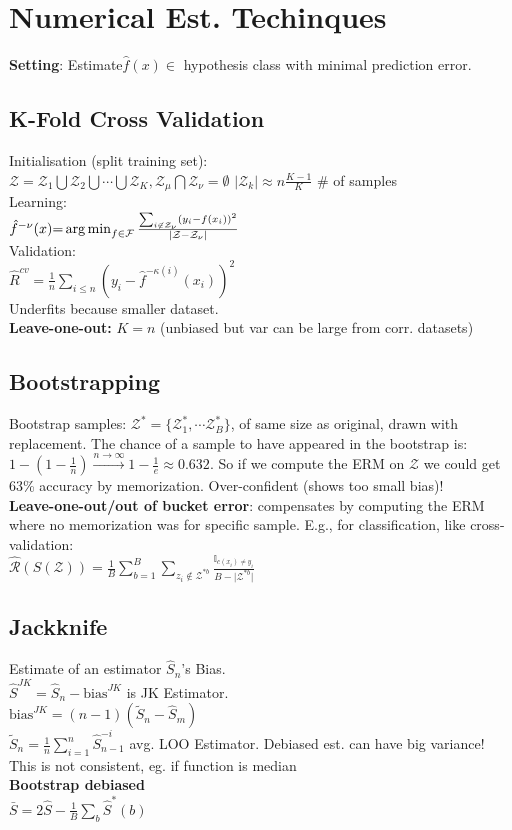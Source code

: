 \section*{Numerical Est. Techinques}
\textbf{Setting}: Estimate$\hat{f}(x) \in $ hypothesis class with minimal prediction error.

\subsection*{K-Fold Cross Validation}
Initialisation (split training set):\\
$\mathcal{Z}=\mathcal{Z}_1\bigcup\mathcal{Z}_2\bigcup\cdots\bigcup\mathcal{Z}_K, \mathcal{Z}_\mu \bigcap\mathcal{Z}_\nu = \emptyset $
$|\mathcal{Z}_k|\approx n\frac{K-1}{K}$ \# of samples\\
Learning:\\
$\hat{f}^{-\nu}(x){=}
\operatorname*{arg\,min}_{f\in\mathcal{F}}\frac{\sum_{i\not\in\mathcal{Z}_\nu}(y_i-f(x_i))^2}{|\mathcal{Z}-\mathcal{Z}_{\nu}|}$\\
Validation:\\
$\hat{R}^{cv} = \frac{1}{n}\sum_{i\leq n}(y_i-\hat{f}^{-\kappa(i)}(x_i))^2$\\
Underfits because smaller dataset.\\
\textbf{Leave-one-out:} $K=n$ (unbiased but var can be large from corr. datasets)
\subsection*{Bootstrapping}
Bootstrap samples: $\mathcal{Z}^*=\{\mathcal{Z}_1^*, \cdots\mathcal{Z}_B^*\}$, of same size as original, drawn with replacement.
The chance of a sample to have appeared in the bootstrap is:\\
$1-(1-\frac{1}{n})\stackrel{n\to\infty}{\to} 1-\frac{1}{e}\approx 0.632$. So if we compute the ERM on $\mathcal{Z}$ we could get 63\% accuracy by memorization. Over-confident (shows too small bias)!\\
\textbf{Leave-one-out/out of bucket error}: compensates by computing the ERM where no memorization was for specific sample. E.g., for classification, like cross-validation:\\
$\hat{\mathcal{R}}(S(\mathcal{Z}))=\frac{1}{B}\sum_{b=1}^B\sum_{z_i\not\in\mathcal{Z}^{*b}}\frac{\mathbb{I}_{c(x_i)\neq y_i}}{B-\lvert\mathcal{Z}^{*b}\rvert}$

\subsection*{Jackknife}
Estimate of an estimator $\hat{S}_n$'s Bias.\\
$\hat{S}^{JK}=\hat{S}_n-\mathrm{bias}^{JK}$ is JK Estimator.\\
$\mathrm{bias}^{JK}{=}(n{-}1)(\tilde{S}_n{-}\hat{S}_m)$\\
$\tilde{S}_n{=}\frac{1}{n}\sum_{i=1}^n\hat{S}_{n{-}1}^{-i}$ avg. LOO Estimator.
Debiased est. can have big variance! This is not consistent, eg. if function is median\\
\textbf{Bootstrap debiased}\\ $\bar{S}{=}2\hat{S}{-}\frac{1}{B}\sum_b\hat{S}^*(b)$

